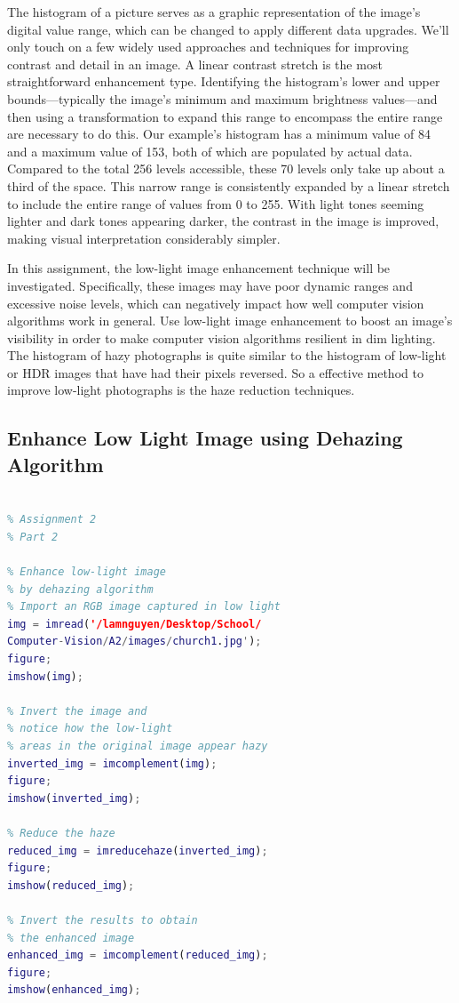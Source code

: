 \documentclass[conference]{IEEEtran}
\begin{document}
The histogram of a picture serves as a graphic representation of the image's digital value range, which can be changed to apply different data upgrades. We'll only touch on a few widely used approaches and techniques for improving contrast and detail in an image. A linear contrast stretch is the most straightforward enhancement type. Identifying the histogram's lower and upper bounds—typically the image's minimum and maximum brightness values—and then using a transformation to expand this range to encompass the entire range are necessary to do this. Our example's histogram has a minimum value of 84 and a maximum value of 153, both of which are populated by actual data. Compared to the total 256 levels accessible, these 70 levels only take up about a third of the space. This narrow range is consistently expanded by a linear stretch to include the entire range of values from 0 to 255. With light tones seeming lighter and dark tones appearing darker, the contrast in the image is improved, making visual interpretation considerably simpler.

In this assignment, the low-light image enhancement technique will be investigated. Specifically, these images may have poor dynamic ranges and excessive noise levels, which can negatively impact how well computer vision algorithms work in general. Use low-light image enhancement to boost an image's visibility in order to make computer vision algorithms resilient in dim lighting. The histogram of hazy photographs is quite similar to the histogram of low-light or HDR images that have had their pixels reversed. So a effective method to improve low-light photographs is the haze reduction techniques.

\subsection{Enhance Low Light Image using Dehazing Algorithm}

\begin{lstlisting}[language=Matlab]

% Assignment 2
% Part 2

% Enhance low-light image 
% by dehazing algorithm
% Import an RGB image captured in low light
img = imread('/lamnguyen/Desktop/School/
Computer-Vision/A2/images/church1.jpg');
figure; 
imshow(img);

% Invert the image and 
% notice how the low-light
% areas in the original image appear hazy
inverted_img = imcomplement(img);
figure;
imshow(inverted_img);

% Reduce the haze 
reduced_img = imreducehaze(inverted_img);
figure;
imshow(reduced_img);

% Invert the results to obtain
% the enhanced image
enhanced_img = imcomplement(reduced_img);
figure;
imshow(enhanced_img);

\end{lstlisting}
\end{document}
